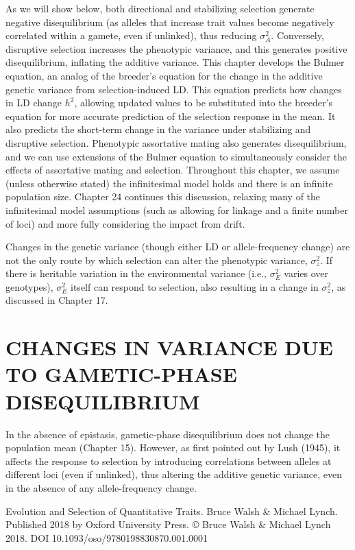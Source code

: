 \documentclass{article}
\begin{document}
As we will show below, both directional and stabilizing selection generate negative disequilibrium (as alleles that increase trait values become negatively correlated within a gamete, even if unlinked), thus reducing  $ \sigma_A^2 $. Conversely, disruptive selection increases the phenotypic variance, and this generates positive disequilibrium, inflating the additive variance. This chapter develops the Bulmer equation, an analog of the breeder's equation for the change in the additive genetic variance from selection-induced LD. This equation predicts how changes in LD change  $ h^2 $, allowing updated values to be substituted into the breeder's equation for more accurate prediction of the selection response in the mean. It also predicts the short-term change in the variance under stabilizing and disruptive selection. Phenotypic assortative mating also generates disequilibrium, and we can use extensions of the Bulmer equation to simultaneously consider the effects of assortative mating and selection. Throughout this chapter, we assume (unless otherwise stated) the infinitesimal model holds and there is an infinite population size. Chapter 24 continues this discussion, relaxing many of the infinitesimal model assumptions (such as allowing for linkage and a finite number of loci) and more fully considering the impact from drift.

Changes in the genetic variance (though either LD or allele-frequency change) are not the only route by which selection can alter the phenotypic variance,  $ \sigma_z^2 $. If there is heritable variation in the environmental variance (i.e.,  $ \sigma_E^2 $ varies over genotypes),  $ \sigma_E^2 $ itself can respond to selection, also resulting in a change in  $ \sigma_z^2 $, as discussed in Chapter 17.

\section{CHANGES IN VARIANCE DUE TO GAMETIC-PHASE DISEQUILIBRIUM}
In the absence of epistasis, gametic-phase disequilibrium does not change the population mean (Chapter 15). However, as first pointed out by Lush (1945), it affects the response to selection by introducing correlations between alleles at different loci (even if unlinked), thus altering the additive genetic variance, even in the absence of any allele-frequency change.

Evolution and Selection of Quantitative Traits. Bruce Walsh & Michael Lynch. Published 2018 by Oxford University Press. © Bruce Walsh & Michael Lynch 2018. DOI 10.1093/oso/9780198830870.001.0001
\end{document}
